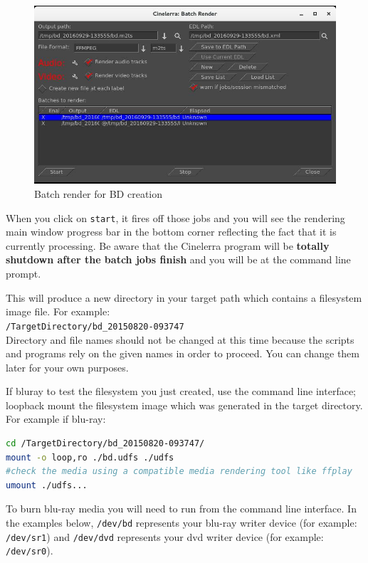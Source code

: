 \vspace{-4ex}
\begin{figure}[htpb]
    \centering
    \includegraphics[width=0.8\linewidth]{images/dvd-batch02.png}
    \caption{Batch render for BD creation}
    \label{fig:dvd-batch02}
\end{figure}

When you click on \texttt{start}, it fires off those jobs and you will see the rendering main window progress bar in the bottom corner reflecting the fact that it is currently processing.  Be aware that the Cinelerra program will be \textbf{totally shutdown after the batch jobs finish} and you will be at the command line prompt.

This will produce a new directory in your target path which contains a filesystem image file.
For example: \\
\texttt{/TargetDirectory/bd\_20150820-093747} \\
Directory and file names should not be changed at this time because the scripts and programs rely on the given names in order to proceed.  You can change them later for your own purposes.

If bluray to test the filesystem you just created, use the command line interface; loopback mount the filesystem image which was generated in the target directory.  For example if blu-ray:

\begin{lstlisting}[language=bash]
cd /TargetDirectory/bd_20150820-093747/
mount -o loop,ro ./bd.udfs ./udfs
#check the media using a compatible media rendering tool like ffplay
umount ./udfs...
\end{lstlisting}

To burn blu-ray media you will need to run from the command line interface.  In the examples below, \texttt{/dev/bd} represents your blu-ray writer device (for example: \texttt{/dev/sr1}) and \texttt{/dev/dvd} represents your dvd writer device (for example: \texttt{/dev/sr0}).

